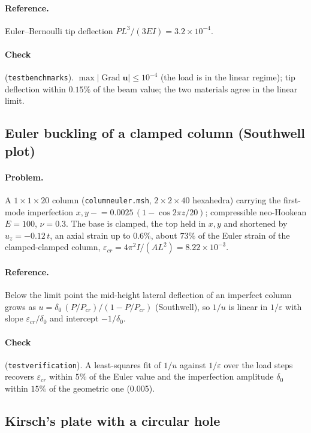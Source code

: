 \documentclass[11pt]{article}
\newcommand{\Grad}{\operatorname{Grad}}
\newcommand{\bu}{\bm{u}}
\DeclareRobustCommand{\file}[1]{{\def\_{\textunderscore\allowbreak}\texttt{#1}}}
\begin{document}
\paragraph{Reference.}
Euler--Bernoulli tip deflection $PL^3/(3EI) = 3.2\times10^{-4}$.

\paragraph{Check} (\file{test\_benchmarks}).  $\max|\Grad\bu| \le 10^{-4}$
(the load is in the linear regime); tip deflection within $0.15\%$ of the
beam value; the two materials agree in the linear limit.

\subsection{Euler buckling of a clamped column (Southwell plot)}

\paragraph{Problem.}
A $1\times1\times20$ column (\file{column\_euler.msh}, $2\times2\times40$
hexahedra) carrying the first-mode imperfection
$x, y \mathrel{-}= 0.0025\,(1 - \cos 2\pi z/20)$; compressible neo-Hookean
$E = 100$, $\nu = 0.3$.  The base is clamped, the top held in $x, y$ and
shortened by $u_z = -0.12\,t$, an axial strain up to $0.6\%$, about $73\%$
of the Euler strain of the clamped-clamped column,
$\varepsilon_{cr} = 4\pi^2I/(AL^2) = 8.22\times10^{-3}$.

\paragraph{Reference.}
Below the limit point the mid-height lateral deflection of an imperfect
column grows as $u = \delta_0\,(P/P_{cr})/(1 - P/P_{cr})$ (Southwell), so
$1/u$ is linear in $1/\varepsilon$ with slope $\varepsilon_{cr}/\delta_0$
and intercept $-1/\delta_0$.

\paragraph{Check} (\file{test\_verification}).  A least-squares fit of
$1/u$ against $1/\varepsilon$ over the load steps recovers
$\varepsilon_{cr}$ within $5\%$ of the Euler value and the imperfection
amplitude $\delta_0$ within $15\%$ of the geometric one (0.005).

\subsection{Kirsch's plate with a circular hole}
\end{document}
